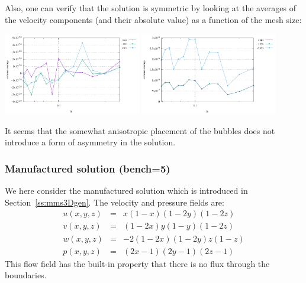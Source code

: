 Also, one can verify that the solution is symmetric by looking at the averages of the 
velocity components (and their absolute value) as a function of the mesh size:
\begin{center}
\includegraphics[width=6cm]{python_codes/fieldstone_82/results/bench4/averages.pdf}
\includegraphics[width=6cm]{python_codes/fieldstone_82/results/bench4/averages_abs.pdf}
\end{center}
It seems that the somewhat anisotropic placement of the bubbles does not introduce 
a form of asymmetry in the solution.

\subsubsection*{Manufactured solution (bench=5)}

We here consider the manufactured solution which is introduced in Section~\ref{ss:mms3Dgen}.
The velocity and pressure fields are:
\begin{eqnarray}
u(x,y,z) &=& x(1-x)(1-2y)(1-2z)\\
v(x,y,z) &=& (1-2x) y(1-y) (1-2z) \\
w(x,y,z) &=& -2(1-2x)(1-2y)z(1-z) \\
p(x,y,z) &=& (2x-1)(2y-1)(2z-1)
\end{eqnarray}
This flow field has the built-in property that there is no flux through the 
boundaries.

